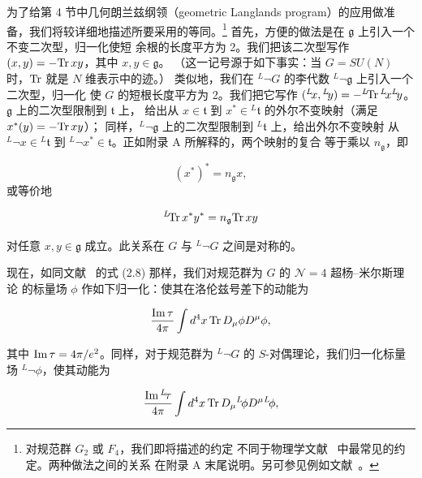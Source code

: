 为了给第 4 节中几何朗兰兹纲领（geometric Langlands program）的应用做准备，我们将较详细地描述所要采用的等同。\footnote{对规范群
$G_2$ 或 $F_4$，我们即将描述的约定
不同于物理学文献~\cite{ref41,ref42} 中最常见的约定。两种做法之间的关系
在附录 A 末尾说明。另可参见例如文献~\cite{ref71}。} 首先，方便的做法是在 $\mathfrak g$ 上引入一个不变二次型，归一化使短
余根的长度平方为 2。我们把该二次型写作 $(x,y)=-{\rm Tr}\,xy$，其中 $x,y\in\mathfrak g$。
（这一记号源于如下事实：当 $G=SU(N)$ 时，${\rm Tr}$ 就是 $N$ 维表示中的迹。）
类似地，我们在 $^L\neg G$ 的李代数 $^L\neg\mathfrak g$ 上引入一个二次型，归一化
使 $G$ 的短根长度平方为 2。我们把它写作 $({}^L\negthinspace x,{}^L\negthinspace y)=
-{}^L\negthinspace{\rm Tr}\,^L\negthinspace x{}^L\negthinspace y$。$\mathfrak g$ 上的二次型限制到 $\mathfrak t$ 上，
给出从 $x\in \mathfrak t$ 到 $x^*\in {}^L\mathfrak t$ 的外尔不变映射（满足 $x^*(y)=-{\rm Tr}\,xy$）；
同样，$^L\neg\mathfrak g$ 上的二次型限制到 $^L\mathfrak t$ 上，给出外尔不变映射
从 $^L\neg x\in {}^L\mathfrak t$ 到 $^L\neg x^*\in \mathfrak t$。正如附录 A 所解释的，两个映射的复合
等于乘以 $n_{\mathfrak g}$，即

\setcounter{equation}{14}
\begin{equation}\label{eq:2.15}
  (x^*)^*=n_{\mathfrak g}x,
\end{equation}
 或等价地

\setcounter{equation}{15}
\begin{equation}\label{eq:2.16}
  ^L\negthinspace{\rm Tr}\, x^*y^*=n_{\mathfrak g}{\rm Tr}\,xy
\end{equation}

对任意 $x,y\in \mathfrak g$ 成立。此关系在 $G$ 与 $^L\neg G$ 之间是对称的。

现在，如同文献~\cite{ref8} 的式 (2.8) 那样，我们对规范群为 $G$ 的 ${\mathcal N}=4$ 超杨–米尔斯理论
的标量场 $\phi$ 作如下归一化：使其在洛伦兹号差下的动能为

\setcounter{equation}{16}
\begin{equation}\label{eq:2.17}
  {{\rm Im}\,\tau\over 4\pi}\int d^4x\,{\rm Tr}\,D_\mu\phi D^\mu\phi,
\end{equation}

其中 ${\rm Im}\,\tau=4\pi/e^2$。同样，对于规范群为 $^L\neg G$ 的 $S$-对偶理论，我们归一化标量场
$^L\neg \phi$，使其动能为

\setcounter{equation}{17}
\begin{equation}\label{eq:2.18}
  {{\rm Im}\,{}^L\negthinspace\tau\over 4\pi}\int d^4x\,{\rm Tr}\,D_\mu{}^L\negthinspace\phi D^\mu{}^L\negthinspace\phi,
\end{equation}

